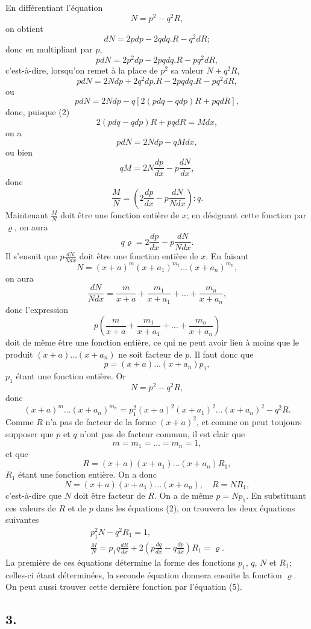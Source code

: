 \documentclass[oneside, 12 pt, leqno]{memoir}
\begin{document}
En différentiant l'équation
\[N=p^2-q^2 R,\]
on obtient
\[d N=2 p d p-2 q d q. R-q^2 d R;\]
donc en multipliant par \(p\),
\[p d N=2 p^2 d p-2 p q d q. R- pq^2 d R,\]
c'est-à-dire, lorsqu'on remet à la place de \(p^2\) sa valeur \(N+q^2 R\),
\[p d N=2 N d p+2 q^2 d p. R-2 p q d q. R-p q^2 d R,\]
ou
\[p d N=2 N d p-q[2(p d q-q d p) R+p q d R],\]
donc, puisque (2)
\[2(p d q-q d p) R+p q d R=M d x,\]
on a
\[p d N=2 N d p-q M d x,\]
ou bien
\[q M=2 N \frac{d p}{d x}-p \frac{d N}{d x},\]
donc
\[\tag{5}\frac{M}{N}=\left(2 \frac{d p}{d x}-p \frac{d N}{N d x}\right) : q.\]
Maintenant \(\frac{M}{N}\) doit être une fonction entière de \(x\); en désignant cette fonction par \(\varrho\), on aura
\[q \varrho=2 \frac{d p}{d x}-p \frac{d N}{N d x}.\]
Il s'ensuit que \(p \frac{d N}{N d x}\) doit être une fonction entière de \(x\). En faisant
\[N=(x+a)^m\left(x+a_1\right)^{m_1} \dots\left(x+a_n\right)^{m_n},\]
on aura
\[\frac{d N}{N d x}=\frac{m}{x+a}+\frac{m_1}{x+a_1}+\dots+\frac{m_n}{x+a_n},\] 
donc l'expression
\[p\left(\frac{m}{x+a}+\frac{m_1}{x+a_1}+\dots+\frac{m_n}{x+a_n}\right)\]
doit de même être une fonction entière, ce qui ne peut avoir lieu   à moins que le produit \((x+a) \dots\left(x+a_n\right)\) ne soit facteur de \(p\). Il faut donc que
\[p=(x+a) \dots\left(x+a_n\right) p_1,\]
\(p_1\) étant une fonction entière. Or
\[N=p^2-q^2 R,\]
donc
\[(x+a)^m \dots\left(x+a_n\right)^{m_n}=p_1^2(x+a)^2\left(x+a_1\right)^2 \dots\left(x+a_n\right)^2-q^2 R.\]
Comme \(R\) n'a pas de facteur de la forme \((x+a)^2\), et comme on peut toujours supposer que \(p\) et \(q\) n'ont pas de facteur commun, il est clair que 
\[m=m_1=\dots=m_n=1, \]
et que
\[R=(x+a)\left(x+a_1\right) \dots\left(x+a_n\right) R_1,\]
\(R_1\) étant une fonction entière. On a donc
\[N=(x+a)\left(x+a_1\right) \dots\left(x+a_n\right), \quad R=N R_1,\]
c'est-à-dire que \(N\) doit être facteur de \(R\). On a de même \(p=N p_1\). En substituant ces valeurs de \(R\) et de \(p\) dans les équations (2), on trouvera les deux équations suivantes
\[\tag{6}\begin{gathered}
p_1^2 N-q^2 R_1=1, \\
\frac{M}{N}=p_1 q \frac{d R}{d x}+2\left(p \frac{d q}{d x}-q \frac{d p}{d x}\right) R_1=\varrho.
\end{gathered}\]
La première de ces équations détermine la forme des fonctions \(p_1\), \(q\), \(N\) et \(R_1\); celles-ci étant déterminées, la seconde équation donnera ensuite la fonction \(\varrho\). On peut aussi trouver cette dernière fonction par l'équation (5).

\subsection*{3.}
\end{document}
